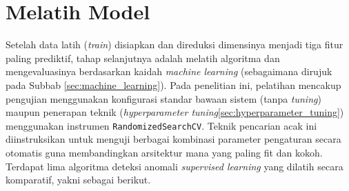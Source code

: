\section{Melatih Model}

Setelah data latih (\textit{train}) disiapkan dan direduksi dimensinya menjadi tiga fitur paling prediktif, tahap selanjutnya adalah melatih algoritma dan mengevaluasinya berdasarkan kaidah \textit{machine learning} (sebagaimana dirujuk pada Subbab \ref{sec:machine_learning}). Pada penelitian ini, pelatihan mencakup pengujian menggunakan konfigurasi standar bawaan sistem (tanpa \textit{tuning}) maupun penerapan teknik (\textit{hyperparameter tuning}\ref{sec:hyperparameter_tuning}) menggunakan instrumen \texttt{RandomizedSearchCV}. Teknik pencarian acak ini diinstruksikan untuk menguji berbagai kombinasi parameter pengaturan secara otomatis guna membandingkan arsitektur mana yang paling fit dan kokoh. Terdapat lima algoritma deteksi anomali \textit{supervised learning} yang dilatih secara komparatif, yakni sebagai berikut.

